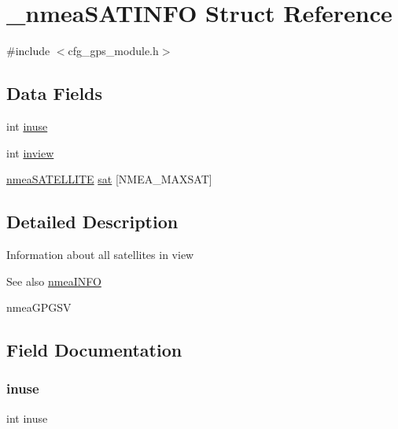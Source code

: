 \hypertarget{struct__nmea_s_a_t_i_n_f_o}{}\section{\+\_\+nmea\+S\+A\+T\+I\+N\+FO Struct Reference}
\label{struct__nmea_s_a_t_i_n_f_o}


{\ttfamily \#include $<$cfg\+\_\+gps\+\_\+module.\+h$>$}

\subsection*{Data Fields}
\begin{DoxyCompactItemize}
\item 
int \hyperlink{struct__nmea_s_a_t_i_n_f_o_a679cabe3b846f2e363f43d8e57433834}{inuse}
\item 
int \hyperlink{struct__nmea_s_a_t_i_n_f_o_a39cbfb42f4909eb17b29618e11adc57e}{inview}
\item 
\hyperlink{cfg__gps__module_8h_a7b2a7e4c7be4ebe7a590ce9239bf1e1f}{nmea\+S\+A\+T\+E\+L\+L\+I\+TE} \hyperlink{struct__nmea_s_a_t_i_n_f_o_a5b801558dc6ca3ff127f92f83ddd40b7}{sat} \mbox{[}N\+M\+E\+A\+\_\+\+M\+A\+X\+S\+AT\mbox{]}
\end{DoxyCompactItemize}


\subsection{Detailed Description}
Information about all satellites in view \begin{DoxySeeAlso}{See also}
\hyperlink{cfg__gps__module_8h_a301ec5a2f9b3d475f65c39e167978791}{nmea\+I\+N\+FO} 

nmea\+G\+P\+G\+SV 
\end{DoxySeeAlso}


\subsection{Field Documentation}
\mbox{\label{struct__nmea_s_a_t_i_n_f_o_a679cabe3b846f2e363f43d8e57433834}} 
\subsubsection{\texorpdfstring{inuse}{inuse}}
{\footnotesize\ttfamily int inuse}

